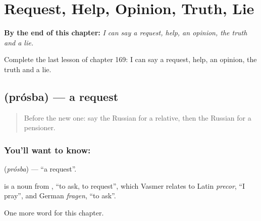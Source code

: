 
\chapter{Request, Help, Opinion, Truth, Lie}
\label{ch:ru-request-help-opinion-truth-lie}

\begin{chapteropening}
\textbf{By the end of this chapter:} \emph{I can say a request, help, an opinion, the truth and a lie.}

Complete the last lesson of chapter 169: I can say a request, help, an opinion, the truth and a lie.
\end{chapteropening}

\section[\texorpdfstring{\ru{просьба} (prósba)}{просьба (prósba)}]{ (prósba) — a request}

\label{lesson:RU-C169-prosba}



\begin{quote}
Before the new one: say the Russian for a relative, then the Russian for a pensioner.
\end{quote}

\subsection*{You'll want to know: }
\textbf{} (\emph{prósba}) — \textquotedblleft{}a request\textquotedblright{}.

\begin{cousinweb}
\textbf{} is a noun from \emph{}, \textquotedblleft{}to ask, to request\textquotedblright{}, which Vasmer relates to Latin \emph{precor}, \textquotedblleft{}I pray\textquotedblright{}, and German \emph{fragen}, \textquotedblleft{}to ask\textquotedblright{}.
\end{cousinweb}

\begin{grammarlens}[title={What you've built}]
One more word for this chapter.
\end{grammarlens}

